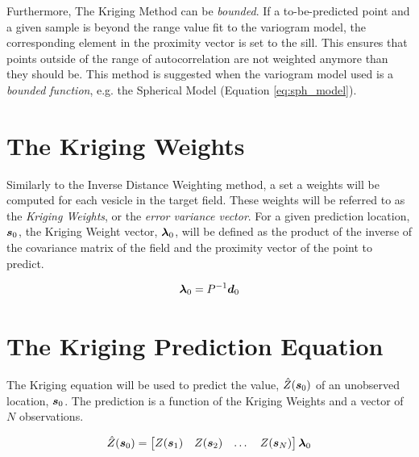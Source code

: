 \noindent Furthermore, The Kriging Method can be \textit{bounded}. If a to-be-predicted point and a given sample is beyond the range value fit to the variogram model, the corresponding element in the proximity vector is set to the sill. This ensures that points outside of the range of autocorrelation are not weighted anymore than they should be. This method is suggested when the variogram model used is a \textit{bounded function}, e.g. the Spherical Model (Equation \ref{eq:sph_model}).

\section{The Kriging Weights} \label{sec:krigweights}
Similarly to the Inverse Distance Weighting method, a set a weights will be computed for each vesicle in the target field. These weights will be referred to as the \textit{Kriging Weights}, or the \textit{error variance vector}. For a given prediction location, ${\it{\boldsymbol{s}}}_0$, the Kriging Weight vector, ${\it{\boldsymbol{\lambda}}}_0$, will be defined as the product of the inverse of the covariance matrix of the field and the proximity vector of the point to predict.

\begin{equation}
    {\it{\boldsymbol{\lambda}}}_{0} = P^{-1}{\it{\boldsymbol{d}}}_{0}
    \label{eq:krigweights}
\end{equation}

\section{The Kriging Prediction Equation}
The Kriging equation will be used to predict the value, $\hat{Z}({\it{\boldsymbol{s}}}_0)$ of an unobserved location, ${\it{\boldsymbol{s}}}_0$. The prediction is a function of the Kriging Weights and a vector of $N$ observations. 

\begin{equation}
    \hat{Z}({\it{\boldsymbol{s}}}_0) = \begin{bmatrix} Z({\it{\boldsymbol{s}}}_1) & Z({\it{\boldsymbol{s}}}_2) & \dots & Z({\it{\boldsymbol{s}}}_N) \end{bmatrix}{\it{\boldsymbol{\lambda}}}_{0}
    \label{eq:krigeq}
\end{equation}


